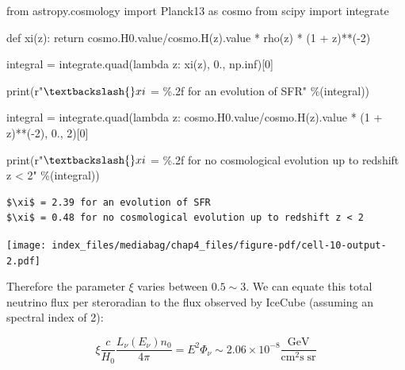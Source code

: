 \documentclass[
  letterpaper,
  DIV=11,
  numbers=noendperiod]{scrreprt}
\newenvironment{Shaded}{\begin{snugshade}}{\end{snugshade}}
\newcommand{\BuiltInTok}[1]{\textcolor[rgb]{0.00,0.23,0.31}{#1}}
\newcommand{\ControlFlowTok}[1]{\textcolor[rgb]{0.00,0.23,0.31}{#1}}
\newcommand{\DecValTok}[1]{\textcolor[rgb]{0.68,0.00,0.00}{#1}}
\newcommand{\FloatTok}[1]{\textcolor[rgb]{0.68,0.00,0.00}{#1}}
\newcommand{\ImportTok}[1]{\textcolor[rgb]{0.00,0.46,0.62}{#1}}
\newcommand{\KeywordTok}[1]{\textcolor[rgb]{0.00,0.23,0.31}{#1}}
\newcommand{\NormalTok}[1]{\textcolor[rgb]{0.00,0.23,0.31}{#1}}
\newcommand{\OperatorTok}[1]{\textcolor[rgb]{0.37,0.37,0.37}{#1}}
\newcommand{\SpecialCharTok}[1]{\textcolor[rgb]{0.37,0.37,0.37}{#1}}
\newcommand{\VerbatimStringTok}[1]{\textcolor[rgb]{0.13,0.47,0.30}{#1}}
\begin{document}
\begin{Shaded}
\begin{Highlighting}[]
\ImportTok{from}\NormalTok{ astropy.cosmology }\ImportTok{import}\NormalTok{ Planck13 }\ImportTok{as}\NormalTok{ cosmo}
\ImportTok{from}\NormalTok{ scipy }\ImportTok{import}\NormalTok{ integrate}

\KeywordTok{def}\NormalTok{ xi(z):}
    \ControlFlowTok{return}\NormalTok{ cosmo.H0.value}\OperatorTok{/}\NormalTok{cosmo.H(z).value }\OperatorTok{*}\NormalTok{ rho(z) }\OperatorTok{*}\NormalTok{ (}\DecValTok{1} \OperatorTok{+}\NormalTok{ z)}\OperatorTok{**}\NormalTok{(}\OperatorTok{{-}}\DecValTok{2}\NormalTok{)}

\NormalTok{integral }\OperatorTok{=}\NormalTok{ integrate.quad(}\KeywordTok{lambda}\NormalTok{ z: xi(z), }\FloatTok{0.}\NormalTok{, np.inf)[}\DecValTok{0}\NormalTok{]}

\BuiltInTok{print}\NormalTok{(}\VerbatimStringTok{r"$\textbackslash{}xi$ = }\SpecialCharTok{\%.2f}\VerbatimStringTok{ for an evolution of SFR"} \OperatorTok{\%}\NormalTok{(integral))}

\NormalTok{integral }\OperatorTok{=}\NormalTok{ integrate.quad(}\KeywordTok{lambda}\NormalTok{ z: cosmo.H0.value}\OperatorTok{/}\NormalTok{cosmo.H(z).value  }\OperatorTok{*}\NormalTok{ (}\DecValTok{1} \OperatorTok{+}\NormalTok{ z)}\OperatorTok{**}\NormalTok{(}\OperatorTok{{-}}\DecValTok{2}\NormalTok{), }\FloatTok{0.}\NormalTok{, }\DecValTok{2}\NormalTok{)[}\DecValTok{0}\NormalTok{]}

\BuiltInTok{print}\NormalTok{(}\VerbatimStringTok{r"$\textbackslash{}xi$ = }\SpecialCharTok{\%.2f}\VerbatimStringTok{ for no cosmological evolution up to redshift z \textless{} 2"} \OperatorTok{\%}\NormalTok{(integral))}
\end{Highlighting}
\end{Shaded}

\begin{verbatim}
$\xi$ = 2.39 for an evolution of SFR
$\xi$ = 0.48 for no cosmological evolution up to redshift z < 2
\end{verbatim}

\texttt{[image: index\_files/mediabag/chap4\_files/figure-pdf/cell-10-output-2.pdf]}

Therefore the parameter \(\xi\) varies between \(0.5\sim 3\). We can
equate this total neutrino flux per steroradian to the flux observed by
IceCube (assuming an spectral index of 2):

\[\xi \frac{c}{H_0} \frac{L_\nu(E_\nu) n_0}{4\pi} = E^2 \Phi_\nu \sim 2.06 \times 10^{-8} \frac{\mathrm{ GeV}}{\mathrm{ cm}^2\mathrm{ s\;} \mathrm{ sr}}\]
\end{document}
